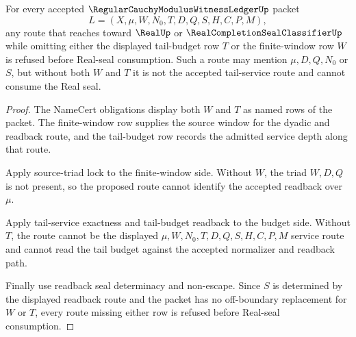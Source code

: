 \begin{theorem}
\label{thm:regular-cauchy-modulus-witness-ledger-tail-window-refusal}
For every accepted $\RegularCauchyModulusWitnessLedgerUp$ packet
$$
L=(X,\mu,W,N_0,T,D,Q,S,H,C,P,M),
$$
any route that reaches toward $\RealUp$ or $\RealCompletionSealClassifierUp$ while omitting either the displayed tail-budget row $T$ or the finite-window row $W$ is refused before Real-seal consumption. Such a route may mention $\mu,D,Q,N_0$ or $S$, but without both $W$ and $T$ it is not the accepted tail-service route and cannot consume the Real seal.
\end{theorem}
\begin{proof}
The NameCert obligations display both $W$ and $T$ as named rows of the packet. The finite-window row supplies the source window for the dyadic and readback route, and the tail-budget row records the admitted service depth along that route.

Apply source-triad lock to the finite-window side. Without $W$, the triad $W,D,Q$ is not present, so the proposed route cannot identify the accepted readback over $\mu$.

Apply tail-service exactness and tail-budget readback to the budget side. Without $T$, the route cannot be the displayed $\mu,W,N_0,T,D,Q,S,H,C,P,M$ service route and cannot read the tail budget against the accepted normalizer and readback path.

Finally use readback seal determinacy and non-escape. Since $S$ is determined by the displayed readback route and the packet has no off-boundary replacement for $W$ or $T$, every route missing either row is refused before Real-seal consumption.
\end{proof}

